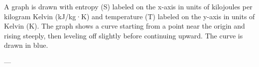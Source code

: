 A graph is drawn with entropy (S) labeled on the x-axis in units of kilojoules per kilogram Kelvin (kJ/kg·K) and temperature (T) labeled on the y-axis in units of Kelvin (K). The graph shows a curve starting from a point near the origin and rising steeply, then leveling off slightly before continuing upward. The curve is drawn in blue.

---